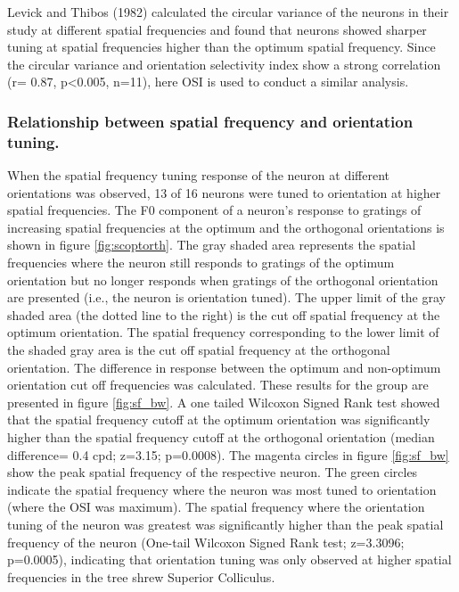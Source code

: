 	Levick and Thibos (1982) calculated the circular variance of the neurons in their study at different spatial frequencies and found that neurons showed sharper tuning at spatial frequencies higher than the optimum spatial frequency. Since the circular variance and orientation selectivity index show a strong correlation (r= 0.87, p<0.005, n=11), here OSI is used to conduct a similar analysis.
	
	\subsubsection{Relationship between spatial frequency and orientation tuning.}
	When the spatial frequency tuning response of the neuron at different orientations was observed, 13 of 16 neurons were tuned to orientation at higher spatial frequencies. The F0 component of a neuron’s response to gratings of increasing spatial frequencies at the optimum and the orthogonal orientations is shown in figure \ref{fig:scoptorth}. The gray shaded area represents the spatial frequencies where the neuron still responds to gratings of the optimum orientation but no longer responds when gratings of the orthogonal orientation are presented (i.e., the neuron is orientation tuned). The upper limit of the gray shaded area (the dotted line to the right) is the cut off spatial frequency at the optimum orientation. The spatial frequency corresponding to the lower limit of the shaded gray area is the cut off spatial frequency at the orthogonal orientation. The difference in response between the optimum and non-optimum orientation cut off frequencies was calculated. These results for the group are presented in figure \ref{fig:sf_bw}. A one tailed Wilcoxon Signed Rank test showed that the spatial frequency cutoff at the optimum orientation was significantly higher than the spatial frequency cutoff at the orthogonal orientation (median difference= 0.4 cpd; z=3.15; p=0.0008). The magenta circles in figure \ref{fig:sf_bw} show the peak spatial frequency of the respective neuron. The green circles indicate the spatial frequency where the neuron was most tuned to orientation (where the OSI was maximum). The spatial frequency where the orientation tuning of the neuron was greatest was significantly higher than the peak spatial frequency of the neuron (One-tail Wilcoxon Signed Rank test; z=3.3096; p=0.0005), indicating that orientation tuning was only observed at higher spatial frequencies in the tree shrew Superior Colliculus.
	
